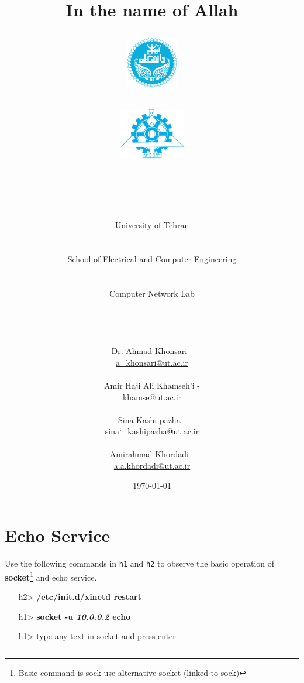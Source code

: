\documentclass[10pt,a4paper]{article}
\title{
\normalsize In the name of Allah\\
\vspace{10pt}
\LARGE\FR{بسم \allah الرحمن الرحیم}
\vspace{10pt}
\begin{center}
	\begin{minipage}{0.48\textwidth} \begin{flushleft}
			\includegraphics[height=64pt,width=64pt]{../img/logo.png}
	\end{flushleft}\end{minipage}
	\begin{minipage}{0.48\textwidth} \begin{flushright}
			\includegraphics[height=64pt]{../img/eng-logo.png}
	\end{flushright}\end{minipage}
\end{center}
\vspace*{-64pt}
	\huge \titleText\\
\vspace{40pt}
}
\author{
	\huge University of Tehran\\
	\LARGE \FR{دانشگاه تهران}\\
	\\
	\LARGE School of Electrical and Computer Engineering\\
	\FR{دانشکده مهندسی برق و کامپیوتر}\\
	\\
	\Large Computer Network Lab\\
	\FR{آزمایشگاه شبکه‌های کامپیوتری}\\
	\\
	\\
	\\
	\normalfont
	Dr. Ahmad Khonsari - \FR{احمد خونساری}\\
	\href{mailto:a_khonsari@ut.ac.ir}{a\_khonsari@ut.ac.ir}\\
	\\
	\normalsize
	Amir Haji Ali Khamseh'i - \FR{امیر حاجی علی خمسه‌ء}\\
	\href{mailto:khamse@ut.ac.ir}{khamse@ut.ac.ir}\\
	\\
	\normalsize
	Sina Kashi pazha - \FR{سینا کاشی پزها}\\
	\href{mailto:sina\char`_kashipazha@ut.ac.ir}{sina\char`_kashipazha@ut.ac.ir}\\
	\\
	\normalsize
	Amirahmad Khordadi - \FR{امیر احمد خردادی}\\
	\href{mailto:a.a.khordadi@ut.ac.ir}{a.a.khordadi@ut.ac.ir}
}
\date{\vspace{30pt}\today\\\vspace{10pt}{\selectlanguage{farsi}\today}}
\numberwithin{equation}{section}
\numberwithin{figure}{section}
\numberwithin{table}{section}
\begin{document}

\maketitle


\pagebreak




\section{Echo Service}
Use the following commands in \texttt{h1} and \texttt{h2} to observe the basic operation of \textbf{socket}\footnote{Basic command is sock use alternative socket (linked to sock)} and echo service. \\
\begin{itemize}
	\item [h2>] \textbf{/etc/init.d/xinetd restart}
	\item [h1>] \textbf{socket -u \textit{10.0.0.2} echo}
	\item [h1>]type any text in socket and press enter
\end{itemize}
\begin{lstlisting}[language=bash]
\end{lstlisting}
\end{document}
